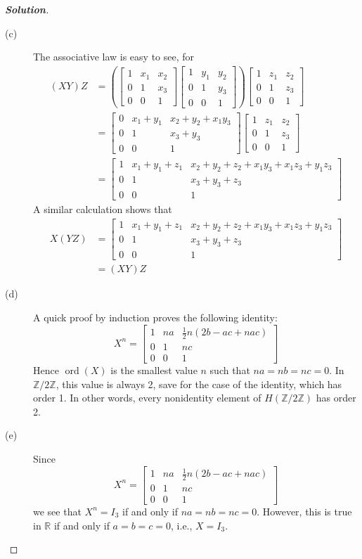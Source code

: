 \documentclass[12pt,leqno]{book}
\theoremstyle{definition}
\newcommand{\ord}{\operatorname{ord}}
\newcommand{\Z}{\mathbb{Z}}
\newcommand{\R}{\mathbb{R}}
\newenvironment{Solution}{\begin{proof}[\textnormal{\textbf{Solution}}]}{\end{proof}}
\begin{document}
\begin{description}
\begin{Solution}
\begin{description}
    \item [(c)] The associative law is easy to see, for \begin{align*}(XY)Z&=\left(\begin{bmatrix}1&x_1&x_2\\0&1&x_3\\0&0&1\end{bmatrix}\begin{bmatrix}1&y_1&y_2\\0&1&y_3\\0&0&1\end{bmatrix}\right)\begin{bmatrix}1&z_1&z_2\\0&1&z_3\\0&0&1\end{bmatrix}\\&=\begin{bmatrix}0&x_1+y_1&x_2+y_2+x_1y_3\\0&1&x_3+y_3\\0&0&1\end{bmatrix}\begin{bmatrix}1&z_1&z_2\\0&1&z_3\\0&0&1\end{bmatrix}\\&=\begin{bmatrix}1&x_1+y_1+z_1&x_2+y_2+z_2+x_1y_3+x_1z_3+y_1z_3\\0&1&x_3+y_3+z_3\\0&0&1\end{bmatrix}\end{align*} A similar calculation shows that \begin{align*}X(YZ)&=\begin{bmatrix}1&x_1+y_1+z_1&x_2+y_2+z_2+x_1y_3+x_1z_3+y_1z_3\\0&1&x_3+y_3+z_3\\0&0&1\end{bmatrix}\\&=(XY)Z\end{align*}
    \item [(d)] A quick proof by induction proves the following identity:\[X^n=\begin{bmatrix}1&na&\frac{1}{2}n(2b-ac+nac)\\0 & 1 & n c\\0&0&1\end{bmatrix}\] Hence $\ord(X)$ is the smallest value $n$ such that $na=nb=nc=0$. In $\Z/2\Z$, this value is always 2, save for the case of the identity, which has order 1. In other words, every nonidentity element of $H(\Z/2\Z)$ has order 2.
    \item [(e)] Since \[X^n=\begin{bmatrix}1&na&\frac{1}{2}n(2b-ac+nac)\\0 & 1 & n c\\0&0&1\end{bmatrix}\] we see that $X^n=I_3$ if and only if $na=nb=nc=0$. However, this is true in $\R$ if and only if $a=b=c=0$, i.e., $X=I_3$.\qedhere
   \end{description}
  \end{Solution}

\end{description}
\end{document}
